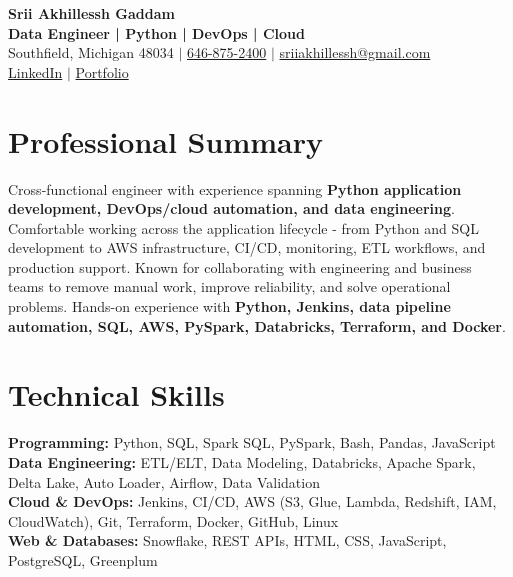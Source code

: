 \documentclass[letterpaper,10pt]{article}
\begin{document}
\fontsize{9.35pt}{10.45pt}\selectfont

\begin{center}
    {\LARGE \textbf{Srii Akhillessh Gaddam}} \\[-1pt]
    \textbf{Data Engineer | Python | DevOps | Cloud} \\[2pt]
    Southfield, Michigan 48034 $|$
    \href{tel:6468752400}{646-875-2400} $|$
    \href{mailto:sriiakhillessh@gmail.com}{sriiakhillessh@gmail.com} \\[1pt]
    \href{https://www.linkedin.com/in/srii-akhiilessh-gaddam-b48668191/}{LinkedIn} $|$
    \href{https://sriiakhillesshg.github.io/portfolio/}{Portfolio}
\end{center}
\vspace{-8pt}

\section{Professional Summary}
\small{Cross-functional engineer with experience spanning \textbf{Python application development, DevOps/cloud automation, and data engineering}. Comfortable working across the application lifecycle - from Python and SQL development to AWS infrastructure, CI/CD, monitoring, ETL workflows, and production support. Known for collaborating with engineering and business teams to remove manual work, improve reliability, and solve operational problems. Hands-on experience with \textbf{Python, Jenkins, data pipeline automation, SQL, AWS, PySpark, Databricks, Terraform, and Docker}.}

\section{Technical Skills}
\small{
\textbf{Programming:} Python, SQL, Spark SQL, PySpark, Bash, Pandas, JavaScript \\
\textbf{Data Engineering:} ETL/ELT, Data Modeling, Databricks, Apache Spark, Delta Lake, Auto Loader, Airflow, Data Validation \\
\textbf{Cloud \& DevOps:} Jenkins, CI/CD, AWS (S3, Glue, Lambda, Redshift, IAM, CloudWatch), Git, Terraform, Docker, GitHub, Linux \\
\textbf{Web \& Databases:} Snowflake, REST APIs, HTML, CSS, JavaScript, PostgreSQL, Greenplum
}

\end{document}
